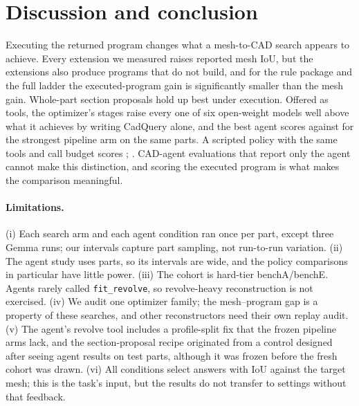 \section{Discussion and conclusion}
\label{sec:discussion}

Executing the returned program changes what a mesh-to-CAD search appears to achieve. Every extension we measured raises reported mesh IoU, but the extensions also produce programs that do not build, and for the rule package and the full ladder the executed-program gain is significantly smaller than the mesh gain. Whole-part section proposals hold up best under execution. Offered as tools, the optimizer's stages raise every one of six open-weight models well above what it achieves by writing CadQuery alone, and the best agent scores \mGemmaSkills{} against \agentPipeSec{} for the strongest pipeline arm on the same parts. A scripted policy with the same tools and call budget scores \policyMatchedCad; \policyVerdict. CAD-agent evaluations that report only the agent cannot make this distinction, and scoring the executed program is what makes the comparison meaningful.

\paragraph{Limitations.}
(i) Each search arm and each agent condition ran once per part, except three Gemma runs; our intervals capture part sampling, not run-to-run variation. (ii) The agent study uses \nAgentParts{} parts, so its intervals are wide, and the policy comparisons in particular have little power. (iii) The cohort is hard-tier benchA/benchE. Agents rarely called \texttt{fit\_revolve}, so revolve-heavy reconstruction is not exercised. (iv) We audit one optimizer family; the mesh--program gap is a property of these searches, and other reconstructors need their own replay audit. (v) The agent's revolve tool includes a profile-split fix that the frozen pipeline arms lack, and the section-proposal recipe originated from a control designed after seeing agent results on test parts, although it was frozen before the fresh cohort was drawn. (vi) All conditions select answers with IoU against the target mesh; this is the task's input, but the results do not transfer to settings without that feedback.
